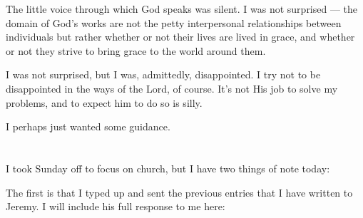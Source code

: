 The little voice through which God speaks was silent. I was not surprised --- the domain of God's works are not the petty interpersonal relationships between individuals but rather whether or not their lives are lived in grace, and whether or not they strive to bring grace to the world around them.

I was not surprised, but I was, admittedly, disappointed. I try not to be disappointed in the ways of the Lord, of course. It's not His job to solve my problems, and to expect him to do so is silly.

I perhaps just wanted some guidance.

\section{}

I took Sunday off to focus on church, but I have two things of note today:

The first is that I typed up and sent the previous entries that I have written to Jeremy. I will include his full response to me here:

